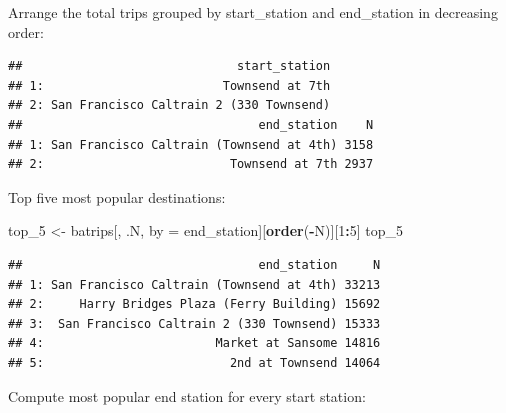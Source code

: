 \documentclass[]{book}
\newenvironment{Shaded}{\begin{snugshade}}{\end{snugshade}}
\newcommand{\DataTypeTok}[1]{\textcolor[rgb]{0.13,0.29,0.53}{#1}}
\newcommand{\DecValTok}[1]{\textcolor[rgb]{0.00,0.00,0.81}{#1}}
\newcommand{\KeywordTok}[1]{\textcolor[rgb]{0.13,0.29,0.53}{\textbf{#1}}}
\newcommand{\NormalTok}[1]{#1}
\newcommand{\OperatorTok}[1]{\textcolor[rgb]{0.81,0.36,0.00}{\textbf{#1}}}
\newcommand{\StringTok}[1]{\textcolor[rgb]{0.31,0.60,0.02}{#1}}
\begin{document}
Arrange the total trips grouped by start\_station and end\_station in decreasing order:

\begin{Shaded}
\end{Shaded}

\begin{verbatim}
##                              start_station
## 1:                         Townsend at 7th
## 2: San Francisco Caltrain 2 (330 Townsend)
##                                 end_station    N
## 1: San Francisco Caltrain (Townsend at 4th) 3158
## 2:                          Townsend at 7th 2937
\end{verbatim}

Top five most popular destinations:

\begin{Shaded}
\begin{Highlighting}[]
\NormalTok{top_}\DecValTok{5}\NormalTok{ <-}\StringTok{ }\NormalTok{batrips[, .N, by =}\StringTok{ }\NormalTok{end_station][}\KeywordTok{order}\NormalTok{(}\OperatorTok{-}\NormalTok{N)][}\DecValTok{1}\OperatorTok{:}\DecValTok{5}\NormalTok{]}
\NormalTok{top_}\DecValTok{5}
\end{Highlighting}
\end{Shaded}

\begin{verbatim}
##                                 end_station     N
## 1: San Francisco Caltrain (Townsend at 4th) 33213
## 2:     Harry Bridges Plaza (Ferry Building) 15692
## 3:  San Francisco Caltrain 2 (330 Townsend) 15333
## 4:                        Market at Sansome 14816
## 5:                          2nd at Townsend 14064
\end{verbatim}

Compute most popular end station for every start station:

\begin{Shaded}
\end{Shaded}
\end{document}

